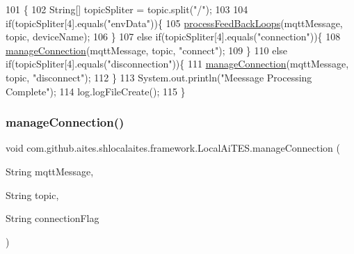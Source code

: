 \begin{DoxyCode}
101                                                                                                   \{
102         String[] topicSpliter = topic.split(\textcolor{stringliteral}{"/"});
103         
104         \textcolor{keywordflow}{if}(topicSpliter[4].equals(\textcolor{stringliteral}{"envData"}))\{
105             \mbox{\hyperlink{classcom_1_1github_1_1aites_1_1shlocalaites_1_1framework_1_1_local_ai_t_e_s_a76541bc0beefb5b50d9c6370abff881e}{processFeedBackLoops}}(mqttMessage, topic, deviceName);
106         \}
107         \textcolor{keywordflow}{else} \textcolor{keywordflow}{if}(topicSpliter[4].equals(\textcolor{stringliteral}{"connection"}))\{
108             \mbox{\hyperlink{classcom_1_1github_1_1aites_1_1shlocalaites_1_1framework_1_1_local_ai_t_e_s_ab47f54556f1287c55d41da05b315bd54}{manageConnection}}(mqttMessage, topic, \textcolor{stringliteral}{"connect"});
109         \}
110         \textcolor{keywordflow}{else} \textcolor{keywordflow}{if}(topicSpliter[4].equals(\textcolor{stringliteral}{"disconnection"}))\{
111             \mbox{\hyperlink{classcom_1_1github_1_1aites_1_1shlocalaites_1_1framework_1_1_local_ai_t_e_s_ab47f54556f1287c55d41da05b315bd54}{manageConnection}}(mqttMessage, topic, \textcolor{stringliteral}{"disconnect"});
112         \}
113         System.out.println(\textcolor{stringliteral}{"Meessage Processing Complete"});
114         log.logFileCreate();
115     \}
\end{DoxyCode}
\mbox{\label{classcom_1_1github_1_1aites_1_1shlocalaites_1_1framework_1_1_local_ai_t_e_s_ab47f54556f1287c55d41da05b315bd54}} 
\subsubsection{\texorpdfstring{manage\+Connection()}{manageConnection()}}
{\footnotesize\ttfamily void com.\+github.\+aites.\+shlocalaites.\+framework.\+Local\+Ai\+T\+E\+S.\+manage\+Connection (\begin{DoxyParamCaption}\item[{String}]{mqtt\+Message,  }\item[{String}]{topic,  }\item[{String}]{connection\+Flag }\end{DoxyParamCaption})\hspace{0.3cm}{\ttfamily [private]}}



